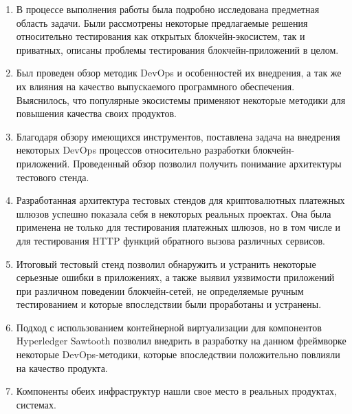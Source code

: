\begin{enumerate}
  \item В процессе выполнения работы была подробно исследована предметная область задачи. Были рассмотрены некоторые предлагаемые решения относительно тестирования как открытых блокчейн-экосистем, так и приватных, описаны проблемы тестирования блокчейн-приложений в целом.
  \item Был проведен обзор методик DevOps и особенностей их внедрения, а так же их влияния на качество выпускаемого программного обеспечения. Выяснилось, что популярные экосистемы применяют некоторые методики для повышения качества своих продуктов.
  \item Благодаря обзору имеющихся инструментов, поставлена задача на внедрения некоторых DevOps процессов относительно разработки блокчейн-приложений. Проведенный обзор позволил получить понимание архитектуры тестового стенда.
  \item Разработанная архитектура тестовых стендов для криптовалютных платежных шлюзов успешно показала себя в некоторых реальных проектах. Она была применена не только для тестирования платежных шлюзов, но в том числе и для тестирования HTTP функций обратного вызова различных сервисов.
  \item Итоговый тестовый стенд позволил обнаружить и устранить некоторые серьезные ошибки в приложениях, а также выявил уязвимости приложений при различном поведении блокчейн-сетей, не определяемые ручным тестированием и которые впоследствии были проработаны и устранены.
  \item Подход с использованием контейнерной виртуализации для компонентов Hyperledger Sawtooth позволил внедрить в разработку на данном фреймворке некоторые DevOps-методики, которые впоследствии положительно повлияли на качество продукта.
  \item Компоненты обеих инфраструктур нашли свое место в реальных продуктах, системах.
\end{enumerate}
